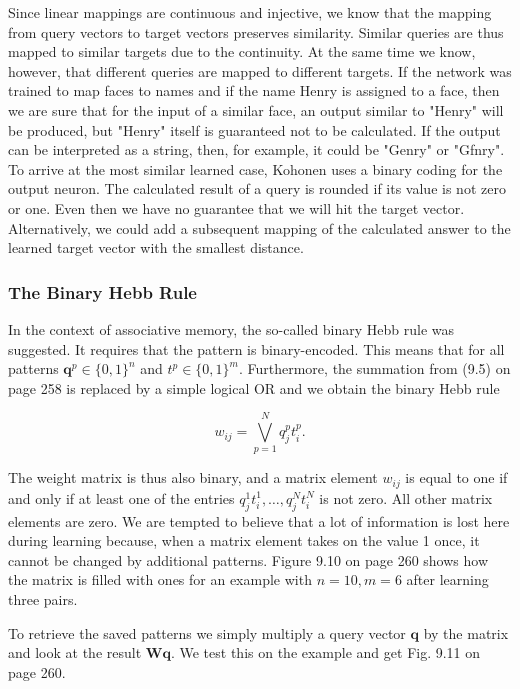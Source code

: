 \documentclass[10pt]{article}
\begin{document}
Since linear mappings are continuous and injective, we know that the mapping from query vectors to target vectors preserves similarity. Similar queries are thus mapped to similar targets due to the continuity. At the same time we know, however, that different queries are mapped to different targets. If the network was trained to map faces to names and if the name Henry is assigned to a face, then we are sure that for the input of a similar face, an output similar to "Henry" will be produced, but "Henry" itself is guaranteed not to be calculated. If the output can be interpreted as a string, then, for example, it could be "Genry" or "Gfnry". To arrive at the most similar learned case, Kohonen uses a binary coding for the output neuron. The calculated result of a query is rounded if its value is not zero or one. Even then we have no guarantee that we will hit the target vector. Alternatively, we could add a subsequent mapping of the calculated answer to the learned target vector with the smallest distance.

\subsubsection*{The Binary Hebb Rule}
In the context of associative memory, the so-called binary Hebb rule was suggested. It requires that the pattern is binary-encoded. This means that for all patterns $\boldsymbol{q}^{p} \in \{0,1\}^{n}$ and $t^{p} \in\{0,1\}^{m}$. Furthermore, the summation from (9.5) on page 258 is replaced by a simple logical OR and we obtain the binary Hebb rule


\begin{equation*}
w_{i j}=\bigvee_{p=1}^{N} q_{j}^{p} t_{i}^{p} . \tag{9.10}
\end{equation*}


The weight matrix is thus also binary, and a matrix element $w_{i j}$ is equal to one if and only if at least one of the entries $q_{j}^{1} t_{i}^{1}, \ldots, q_{j}^{N} t_{i}^{N}$ is not zero. All other matrix elements are zero. We are tempted to believe that a lot of information is lost here during learning because, when a matrix element takes on the value 1 once, it cannot be changed by additional patterns. Figure 9.10 on page 260 shows how the matrix is filled with ones for an example with $n=10, m=6$ after learning three pairs.

To retrieve the saved patterns we simply multiply a query vector $\boldsymbol{q}$ by the matrix and look at the result $\boldsymbol{W q}$. We test this on the example and get Fig. 9.11 on page 260.
\end{document}

